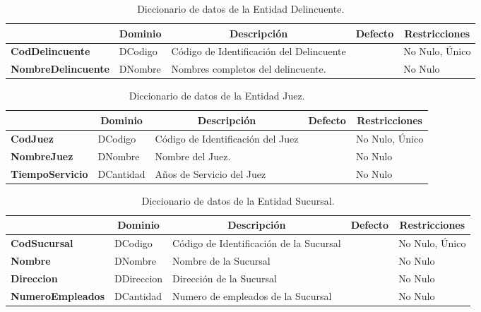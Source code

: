 \begin{table}[H]
\centering
\caption{Diccionario de datos de la Entidad Delincuente.}
\label{tab-Dicc-23}
\begin{tabular}{>{\bfseries}m{4.0cm}>{}m{3.0cm}>{}m{6.0cm}>{}m{5.0cm}>{}m{2.0cm}}
\toprule
\multicolumn{1}{c}{\textbf{Atributo}} & \multicolumn{1}{c}{\textbf{Dominio}} & \multicolumn{1}{c}{\textbf{Descripción}} & \multicolumn{1}{c}{\textbf{Defecto}} & \multicolumn{1}{c}{\textbf{Restricciones}} \\ \midrule
CodDelincuente	&	DCodigo	&	Código de Identificación del Delincuente	&		&	No Nulo, Único\\
NombreDelincuente	&	DNombre	&	Nombres completos del delincuente.	&		&	No Nulo\\
\bottomrule
\end{tabular}
\end{table}

\begin{table}[H]
\centering
\caption{Diccionario de datos de la Entidad Juez.}
\label{tab-Dicc-24}
\begin{tabular}{>{\bfseries}m{4.0cm}>{}m{3.0cm}>{}m{6.0cm}>{}m{5.0cm}>{}m{2.0cm}}
\toprule
\multicolumn{1}{c}{\textbf{Atributo}} & \multicolumn{1}{c}{\textbf{Dominio}} & \multicolumn{1}{c}{\textbf{Descripción}} & \multicolumn{1}{c}{\textbf{Defecto}} & \multicolumn{1}{c}{\textbf{Restricciones}} \\ \midrule
CodJuez	&	DCodigo	&	Código de Identificación del Juez	&		&	No Nulo, Único\\
NombreJuez	&	DNombre	&	Nombre del Juez.	&		&	No Nulo\\
TiempoServicio	&	DCantidad	&	Años de Servicio del Juez	&		&	No Nulo\\
\bottomrule
\end{tabular}
\end{table}

\begin{table}[H]
\centering
\caption{Diccionario de datos de la Entidad Sucursal.}
\label{tab-Dicc-25}
\begin{tabular}{>{\bfseries}m{4.0cm}>{}m{3.0cm}>{}m{6.0cm}>{}m{5.0cm}>{}m{2.0cm}}
\toprule
\multicolumn{1}{c}{\textbf{Atributo}} & \multicolumn{1}{c}{\textbf{Dominio}} & \multicolumn{1}{c}{\textbf{Descripción}} & \multicolumn{1}{c}{\textbf{Defecto}} & \multicolumn{1}{c}{\textbf{Restricciones}} \\ \midrule
CodSucursal	&	DCodigo	&	Código de Identificación de la Sucursal	&		&	No Nulo, Único\\
Nombre	&	DNombre	&	Nombre de la Sucursal	&		&	No Nulo\\
Direccion	&	DDireccion	&	Dirección de la Sucursal	&		&	No Nulo\\
NumeroEmpleados	&	DCantidad	&	Numero de empleados de la Sucursal	&		&	No Nulo\\
\bottomrule
\end{tabular}
\end{table}

